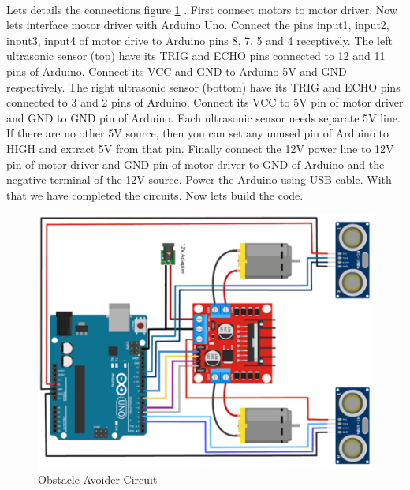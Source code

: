 \paragraph{ } Lets details the connections figure \ref{fig:ckt_avoider} . First connect motors to motor driver. Now lets interface motor driver with Arduino Uno. Connect the pins input1, input2, input3, input4 of motor drive to Arduino pins 8, 7, 5 and 4 receptively. The left ultrasonic sensor (top) have its TRIG and ECHO pins connected to 12 and 11 pins of Arduino. Connect its VCC and GND to Arduino 5V and GND respectively. The right ultrasonic sensor (bottom) have its TRIG and ECHO pins connected to 3 and 2 pins of Arduino. Connect its VCC to 5V pin of motor driver and GND to GND pin of Arduino. Each ultrasonic sensor needs separate 5V line. If there are no other 5V source, then you can set any unused pin of Arduino to HIGH and extract 5V from that pin. Finally connect the 12V power line to 12V pin of motor driver and GND pin of motor driver to GND of Arduino and the negative terminal of the 12V source. Power the Arduino using USB cable. With that we have completed the circuits. Now lets build the code.

\begin{figure}
	\centering
	\includegraphics{Images/Ultrasonic/obj_avoider_ckt.png}
	\caption{Obstacle Avoider Circuit}
	\label{fig:ckt_avoider}
\end{figure}

